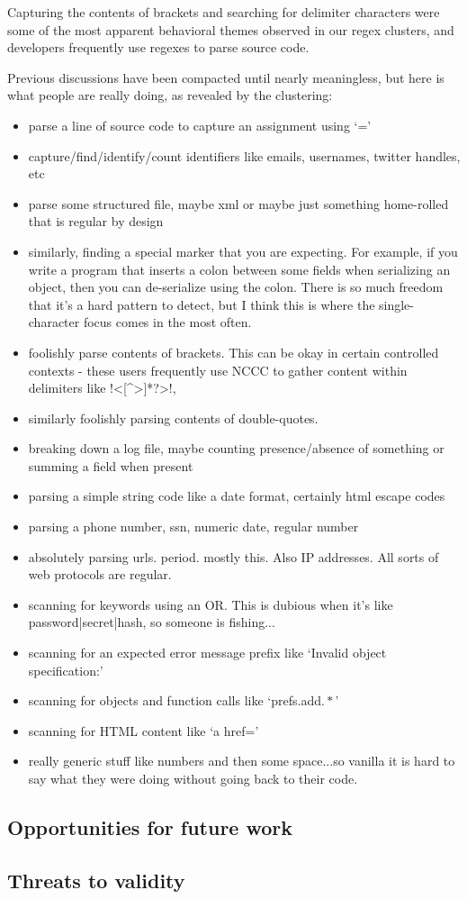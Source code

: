 Capturing the contents of brackets and searching for delimiter characters were some of the most apparent  behavioral themes observed in our regex clusters, and developers frequently use regexes to parse source code.

  Previous discussions have been compacted until nearly meaningless, but here is what people are really doing, as revealed by the clustering:
\begin{itemize}
\item parse a line of source code to capture an assignment using `='
\item capture/find/identify/count identifiers like emails, usernames, twitter handles, etc
\item parse some structured file, maybe xml or maybe just something home-rolled that is regular by design
\item similarly, finding a special marker that you are expecting.  For example, if you write a program that inserts a colon between some fields when serializing an object, then you can de-serialize using the colon.  There is so much freedom that it's a hard pattern to detect, but I think this is where the single-character focus comes in the most often.
\item foolishly parse contents of brackets.  This can be okay in certain controlled contexts - these users frequently use NCCC to gather content within delimiters like \cverb!<[^>]*?>!,
\item similarly foolishly parsing contents of double-quotes.
\item breaking down a log file, maybe counting presence/absence of something or summing a field when present
\item parsing a simple string code like a date format, certainly html escape codes
\item parsing a phone number, ssn, numeric date, regular number
\item absolutely parsing urls. period.  mostly this.  Also IP addresses.  All sorts of web protocols are regular.
\item scanning for keywords using an OR.  This is dubious when it's like password|secret|hash, so someone is fishing...
\item scanning for an expected error message prefix like `Invalid object specification:'
\item scanning for objects and function calls like `prefs.add\(.*\)'
\item scanning for HTML content like `a href='
\item really generic stuff like numbers and then some space...so vanilla it is hard to say what they were doing without going back to their code.

\end{itemize}


\subsection{Opportunities for future work}
\subsection{Threats to validity}
